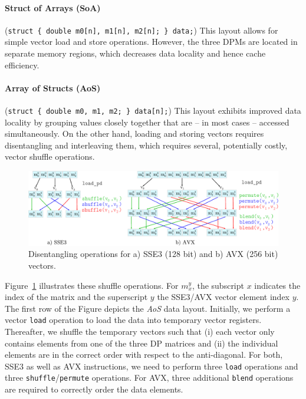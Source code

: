 \documentclass[runningheads,a4paper]{llncs}
\begin{document}
\paragraph*{Struct of Arrays (SoA)} ({\small\texttt{struct \{ double m0[n], m1[n], m2[n]; \} data;}}) 
This layout allows for simple vector load and store operations. 
However, the three DPMs are located in separate memory regions, which decreases
data locality and hence cache efficiency.

\paragraph*{Array of Structs (AoS)} ({\small\texttt{struct \{ double m0, m1, m2; \}
data[n];}}) This layout exhibits improved data locality by grouping values
closely together that are -- in most cases -- accessed simultaneously. On the
other hand, loading and storing vectors requires disentangling and interleaving
them, which requires several, potentially costly, vector shuffle operations. 

\begin{figure}[ht!]
  \centering
  \includegraphics[scale=0.6]{figures/shuffle.pdf}
  \caption{Disentangling operations for a) SSE3 (128 bit) and b) AVX (256 bit) vectors.}
  \label{fig:shufflesse}
\end{figure}

Figure~\ref{fig:shufflesse} illustrates these shuffle operations. 
For $m_x^y$, the subscript $x$ indicates
the index of the matrix and the superscript $y$ the SSE3/AVX vector element
index $y$.  The first row of the Figure depicts the {\em AoS} data layout. 
Initially, we perform a vector \texttt{load} operation
to load the data into temporary vector registers. 
Thereafter, we shuffle the temporary vectors such that (i) each vector only contains elements from one of the three DP matrices and 
(ii) the individual elements are in the correct order with respect to  the anti-diagonal. 
For both, SSE3 as well as AVX instructions, we need to perform three \texttt{load} operations and three \texttt{shuffle}/\texttt{permute} operations. 
For AVX, three additional \texttt{blend} operations are required to correctly order the data elements. 
\end{document}
